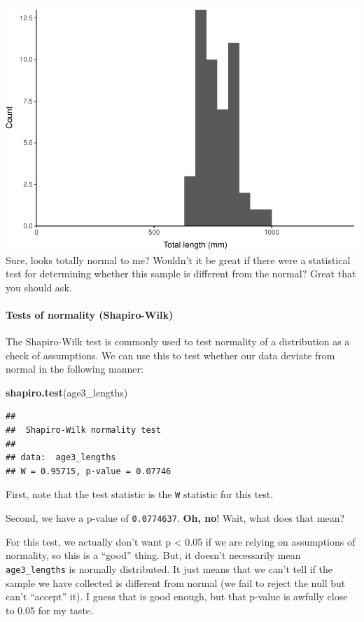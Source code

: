 \documentclass[
]{book}
\newenvironment{Shaded}{\begin{snugshade}}{\end{snugshade}}
\newcommand{\KeywordTok}[1]{\textcolor[rgb]{0.13,0.29,0.53}{\textbf{#1}}}
\newcommand{\NormalTok}[1]{#1}
\begin{document}
\includegraphics{worstr_files/figure-latex/unnamed-chunk-163-1.pdf}
Sure, looks totally normal to me? Wouldn't it be great if there were a statistical test for determining whether this sample is different from the normal? Great that you should ask.

\hypertarget{tests-of-normality-shapiro-wilk}{%
\paragraph{Tests of normality (Shapiro-Wilk)}\label{tests-of-normality-shapiro-wilk}}

The Shapiro-Wilk test is commonly used to test normality of a distribution as a check of assumptions. We can use this to test whether our data deviate from normal in the following manner:

\begin{Shaded}
\begin{Highlighting}[]
\KeywordTok{shapiro.test}\NormalTok{(age3_lengths)}
\end{Highlighting}
\end{Shaded}

\begin{verbatim}
## 
## 	Shapiro-Wilk normality test
## 
## data:  age3_lengths
## W = 0.95715, p-value = 0.07746
\end{verbatim}

First, note that the test statistic is the \texttt{W} statistic for this test.

Second, we have a p-value of \texttt{0.0774637}. \textbf{Oh, no}! Wait, what does that mean?

For this test, we actually don't want p \textless{} 0.05 if we are relying on assumptions of normality, so this is a ``good'' thing. But, it doesn't necessarily mean \texttt{age3\_lengths} is normally distributed. It just means that we can't tell if the sample we have collected is different from normal (we fail to reject the null but can't ``accept'' it). I guess that is good enough, but that p-value is awfully close to 0.05 for my taste.
\end{document}
